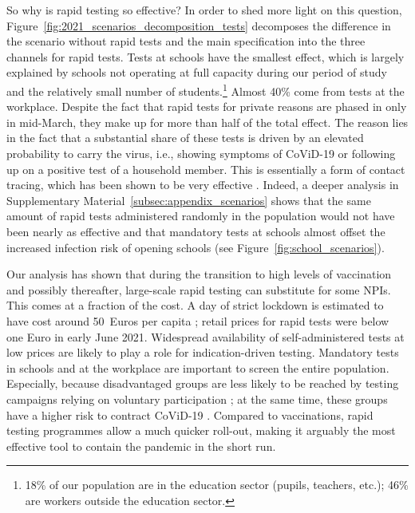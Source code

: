
So why is rapid testing so effective? In order to shed more light on this question,
Figure~\ref{fig:2021_scenarios_decomposition_tests} decomposes the difference in the
scenario without rapid tests and the main specification into the three channels for
rapid tests. Tests at schools have the smallest effect, which is largely explained by
schools not operating at full capacity during our period of study and the relatively
small number of students.\footnote{18\% of our population are in the education sector
    (pupils, teachers, etc.); 46\% are workers outside the education sector.} Almost 40\%
come from tests at the workplace. Despite the fact that rapid tests for private reasons
are phased in only in mid-March, they make up for more than half of the total effect.
The reason lies in the fact that a substantial share of these tests is driven by an
elevated probability to carry the virus, i.e., showing symptoms of CoViD-19 or following
up on a positive test of a household member. This is essentially a form of contact
tracing, which has been shown to be very effective \citep{Contreras2021,
    Fetzer2021,Kretzschmar2020}. Indeed, a deeper analysis in Supplementary
Material~\ref{subsec:appendix_scenarios} shows that the same amount of rapid tests
administered randomly in the population would not have been nearly as effective and that
mandatory tests at schools almost offset the increased infection risk of opening
schools (see Figure~\ref{fig:school_scenarios}).

Our analysis has shown that during the transition to high levels of vaccination and
possibly thereafter, large-scale rapid testing can substitute for some NPIs. This comes
at a fraction of the cost. A day of strict lockdown is
estimated to have cost around 50~Euros per capita \citep{Dorn2020b}; retail
prices for rapid tests were below one Euro in early June 2021. Widespread availability
of self-administered tests at low prices are likely to play a role for indication-driven
testing. Mandatory tests in schools and at the workplace are important to screen the
entire population. Especially, because disadvantaged groups are less likely to be
reached by testing campaigns relying on voluntary participation
\citep[e.g.][]{StillmanTonin2021}; at the same time,
these groups have a higher risk to contract CoViD-19 \citep{KochInstitut2021a}.
Compared to vaccinations, rapid testing programmes allow a much quicker roll-out, making
it arguably the most effective tool to contain the pandemic in the short run.
